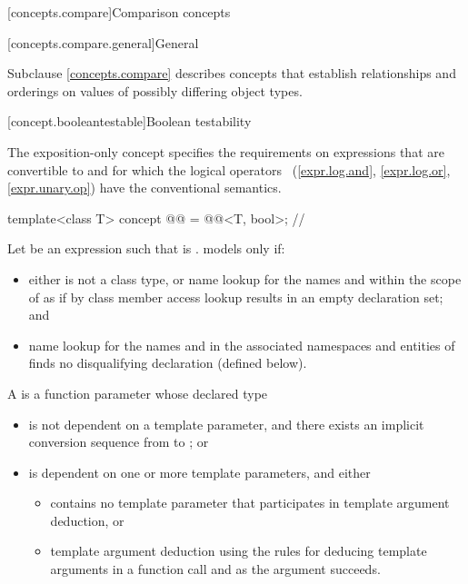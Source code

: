 [concepts.compare]{Comparison concepts}

[concepts.compare.general]{General}

\pnum
Subclause \ref{concepts.compare} describes concepts that establish relationships and orderings
on values of possibly differing object types.

[concept.booleantestable]{Boolean testability}

\pnum
The exposition-only  concept
specifies the requirements on expressions
that are convertible to  and
for which the logical operators~%
(\ref{expr.log.and}, \ref{expr.log.or}, \ref{expr.unary.op})
have the conventional semantics.

\begin{itemdecl}
template<class T>
  concept @@ = @@<T, bool>;  // \expos
\end{itemdecl}

\pnum
Let  be an expression such that
 is .
 models  only if:

\begin{itemize}
\item
either  is not a class type, or
name lookup for the names  and 
within the scope of 
as if by class member access lookup
results in an empty declaration set; and

\item
name lookup for the names  and  in
the associated namespaces and
entities of 
finds no disqualifying declaration (defined below).
\end{itemize}

\pnum
A 
is a function parameter whose declared type 

\begin{itemize}
\item
is not dependent on a template parameter, and
there exists an implicit conversion sequence
from  to ; or

\item
is dependent on one or more template parameters, and either
\begin{itemize}
\item
{} contains no template parameter that
participates in template argument deduction, or
\item
template argument deduction
using the rules for deducing template arguments
in a function call and
 as the argument succeeds.
\end{itemize}
\end{itemize}

